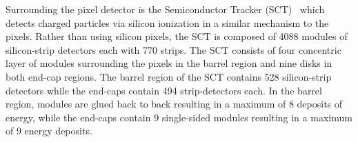 Surrounding the pixel detector is the Semiconductor Tracker (SCT)~\cite{atlas_sct} which detects charged particles via silicon ionization in a similar mechanism to the pixels. Rather than using silicon pixels, the SCT is composed of 4088 modules of silicon-strip detectors each with 770 strips. The SCT consists of four concentric layer of modules surrounding the pixels in the barrel region and nine disks in both end-cap regions. The barrel region of the SCT contains 528 silicon-strip detectors while the end-caps contain 494 strip-detectors each. In the barrel region, modules are glued back to back resulting in a maximum of 8 deposits of energy, while the end-caps contain 9 single-sided modules resulting in a maximum of 9 energy deposits. 